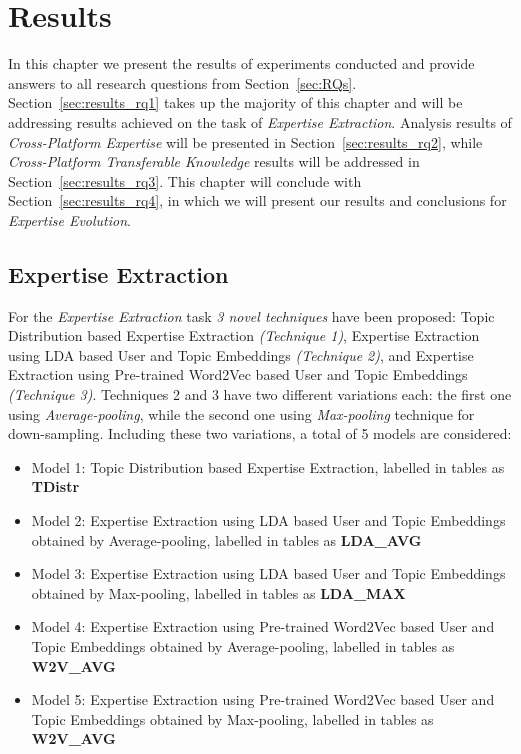 \chapter{Results\label{chap:result}}

    In this chapter we present the results of experiments conducted and provide answers to all research questions from Section~\ref{sec:RQs}. Section~\ref{sec:results_rq1} takes up the majority of this chapter and will be addressing results achieved on the task of \emph{Expertise Extraction}. Analysis results of \emph{Cross-Platform Expertise} will be presented in Section~\ref{sec:results_rq2}, while \emph{Cross-Platform Transferable Knowledge} results will be addressed in Section~\ref{sec:results_rq3}. This chapter will conclude with Section~\ref{sec:results_rq4}, in which we will present our results and conclusions for \emph{Expertise Evolution}.

    \section{Expertise Extraction\label{sec:results_rq1}}
        
        For the \emph{Expertise Extraction} task \emph{3 novel techniques} have been proposed: Topic Distribution based Expertise Extraction \emph{(Technique 1)}, Expertise Extraction using LDA based User and Topic Embeddings \emph{(Technique 2)}, and Expertise Extraction using Pre-trained Word2Vec based User and Topic Embeddings \emph{(Technique 3)}. Techniques 2 and 3 have two different variations each: the first one using \emph{Average-pooling}, while the second one using \emph{Max-pooling} technique for down-sampling. Including these two variations, a total of 5 models are considered:
        
        \begin{itemize}
            \item Model 1: Topic Distribution based Expertise Extraction, labelled in tables as \textbf{TDistr}
            \item Model 2: Expertise Extraction using LDA based User and Topic Embeddings obtained by Average-pooling, labelled in tables as \textbf{LDA\_AVG}
            \item Model 3: Expertise Extraction using LDA based User and Topic Embeddings obtained by Max-pooling, labelled in tables as \textbf{LDA\_MAX}
            \item Model 4: Expertise Extraction using Pre-trained Word2Vec based User and Topic Embeddings obtained by Average-pooling, labelled in tables as \textbf{W2V\_AVG} 
            \item Model 5: Expertise Extraction using Pre-trained Word2Vec based User and Topic Embeddings obtained by Max-pooling, labelled in tables as \textbf{W2V\_AVG} 
        \end{itemize}
        
